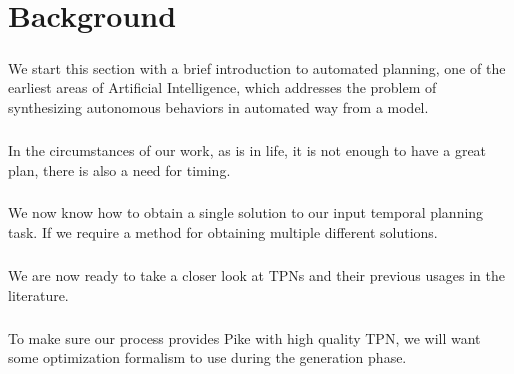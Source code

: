 \chapter{Background}
\label{chap:background}

\paragraph{} We start this section with a brief introduction to automated planning, one of the earliest areas of Artificial Intelligence, which addresses the problem of synthesizing autonomous behaviors in automated way from a model.

% 

\paragraph{} In the circumstances of our work, as is in life, it is not enough to have a great plan, there is also a need for timing.  


\paragraph{} We now know how to obtain a single solution to our input temporal planning task. If we require a method for obtaining multiple different solutions. 


\paragraph{} We are now ready to take a closer look at TPNs and their previous usages in the literature.


\paragraph{} To make sure our process provides Pike with high quality TPN, we will want some optimization formalism to use during the generation phase. 
